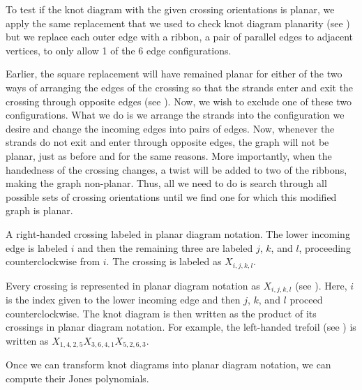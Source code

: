 \begin{paper}
To test if the knot diagram with the given crossing orientations is planar, we
apply the same replacement that we used to check knot diagram planarity
(see \figRibbon) but we replace each outer edge with a ribbon, a pair of
parallel edges to adjacent vertices, to only allow 1 of the 6 edge
configurations.

Earlier, the square replacement will have remained planar for either of the two
ways of arranging the edges of the crossing so that the strands enter and exit
the crossing through opposite edges (see \figGraph).
Now, we wish to exclude one of these two configurations.
What we do is we arrange the strands into the configuration we desire and change
the incoming edges into pairs of edges.
Now, whenever the strands do not exit and enter through opposite edges, the
graph will not be planar, just as before and for the same reasons.
More importantly, when the handedness of the crossing changes, a twist will be
added to two of the ribbons, making the graph non-planar.
Thus, all we need to do is search through all possible sets of crossing
orientations until we find one for which this modified graph is planar.

{A right-handed crossing labeled in planar diagram notation.
The lower incoming edge is labeled $i$ and then the remaining three are labeled
$j$, $k$, and $l$, proceeding counterclockwise from $i$.
The crossing is labeled as $X_{i,j,k,l}$.}

Every crossing is represented in planar diagram notation as $X_{i,j,k,l}$ (see
\figX).
Here, $i$ is the index given to the lower incoming edge and then $j$, $k$, and
$l$ proceed counterclockwise.
The knot diagram is then written as the product of its crossings in planar
diagram notation.
For example, the left-handed trefoil (see \figLabeled) is written as
$X_{1,4,2,5}X_{3,6,4,1}X_{5,2,6,3}$.


Once we can transform knot diagrams into planar diagram notation, we can compute
their Jones polynomials.


\end{paper}
